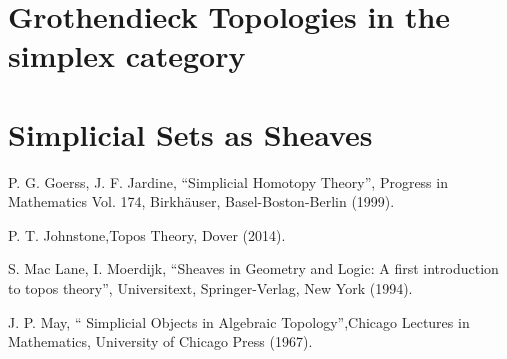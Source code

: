 \section{Grothendieck Topologies in the simplex category}
\label{sec:3}

\section{Simplicial Sets as Sheaves}
\label{sec:4}


\begin{thebibliography}{}

P. G. Goerss, J. F. Jardine, ``Simplicial Homotopy Theory'', Progress in Mathematics Vol. 174,  Birkhäuser, Basel-Boston-Berlin (1999).

P. T. Johnstone,Topos Theory, Dover (2014).

S. Mac Lane, I. Moerdijk, ``Sheaves in Geometry and Logic: A first introduction to topos theory'', Universitext, Springer-Verlag, New York (1994).

J. P. May, `` Simplicial Objects in Algebraic Topology'',Chicago Lectures in Mathematics, University of Chicago Press (1967). 

\end{thebibliography}




